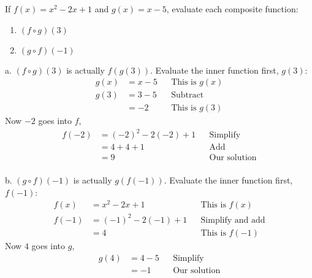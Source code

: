 \begin{exa}
    If $f(x) =x^2-2x+1$ and $g(x) = x-5$, evaluate each composite function:
    \begin{enumerate}[\bfseries a.]
        \item $(f \circ g)(3)$
        \item $(g \circ f)(-1)$
    \end{enumerate}
\end{exa}
%
\vspace{0.2cm}
a. $(f \circ g)(3)$ is actually $f(g(3))$. Evaluate the inner function first, $g(3)$:
\begin{align*}
        g(x) &= x-5  &   &\text{This is $g(x)$}\\
        g(3) &= 3-5  &   &\text{Subtract}\\
             &= -2   &   &\text{This is $g(3)$}
\end{align*}
Now $-2$ goes into $f$,
\begin{align*}
    f(-2) &= (-2)^2-2(-2)+1     &       &\text{Simplify}\\
          &= 4+4+1              &       &\text{Add}\\
          &= 9                  &       &\text{Our solution}
\end{align*}
%
\\[0.2cm]
%
b.  $(g \circ f)(-1)$ is actually $g(f(-1))$. Evaluate the inner function first, $f(-1)$:
\begin{align*}
        f(x)  &= x^2-2x+1  &   &\text{This is $f(x)$}\\
        f(-1) &= (-1)^2-2(-1)+1  &   &\text{Simplify and add}\\
              &= 4   &   &\text{This is $f(-1)$}
\end{align*}
Now $4$ goes into $g$,
\begin{align*}
    g(4) &= 4-5      &       &\text{Simplify}\\
         &= -1       &       &\text{Our solution}\\
\end{align*}
